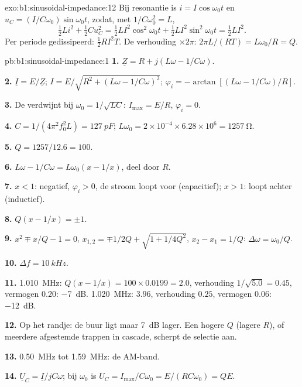\begin{solution}{exo:b1:sinusoidal-impedance:12}
Bij resonantie is $i = I\cos\omega_0 t$ en $u_C = (I/C\omega_0)\sin\omega_0 t$,
zodat, met $1/C\omega_0^2 = L$,
\[
\tfrac12 Li^2 + \tfrac12 Cu_C^2 = \tfrac12 LI^2\cos^2\omega_0 t
+ \tfrac12 LI^2\sin^2\omega_0 t = \tfrac12 LI^2 .
\]
Per periode gedissipeerd: $\tfrac12 RI^2T$. De verhouding $\times 2\pi$: $2\pi L/(RT)
= L\omega_0/R = Q$.
\end{solution}

\begin{solution}{pb:b1:sinusoidal-impedance:1}
\textbf{1.} $\underline Z = R + j(L\omega - 1/C\omega)$.

\textbf{2.} $\underline I = E/\underline Z$; $I = E/\sqrt{R^2 + (L\omega -
1/C\omega)^2}$; $\varphi_i = -\arctan[(L\omega - 1/C\omega)/R]$.

\textbf{3.} De  verdwijnt bij $\omega_0 = 1/\sqrt{LC}$: $I_{\max}
= E/R$, $\varphi_i = 0$.

\textbf{4.} $C = 1/(4\pi^2f_0^2L) = \qty{127}{pF}$; $L\omega_0 = 2\times10^{-4}
\times 6.28\times10^6 = \qty{1257}{\ohm}$.

\textbf{5.} $Q = 1257/12.6 = 100$.

\textbf{6.} $L\omega - 1/C\omega = L\omega_0(x - 1/x)$, deel door $R$.

\textbf{7.} $x < 1$:  negatief, $\varphi_i > 0$, de stroom
loopt voor (capacitief); $x > 1$: loopt achter (inductief).

\textbf{8.} $Q(x - 1/x) = \pm1$.

\textbf{9.} $x^2 \mp x/Q - 1 = 0$, $x_{1,2} = \mp1/2Q + \sqrt{1 + 1/4Q^2}$,
$x_2 - x_1 = 1/Q$: $\Delta\omega = \omega_0/Q$.

\textbf{10.} $\Delta f = \qty{10}{kHz}$.

\textbf{11.} \qty{1.010}{MHz}: $Q(x - 1/x) = 100 \times 0.0199 = 2.0$,
verhouding $1/\sqrt{5.0} = 0.45$, vermogen $0.20$: \qty{-7}{dB}. \qty{1.020}{MHz}:
$3.96$, verhouding $0.25$, vermogen $0.06$: \qty{-12}{dB}.

\textbf{12.} Op het randje: de buur ligt maar \qty{7}{dB} lager. Een hogere
$Q$ (lagere $R$), of meerdere afgestemde trappen in cascade, scherpt de
selectie aan.

\textbf{13.} \qty{0.50}{MHz} tot \qty{1.59}{MHz}: de AM-band.

\textbf{14.} $\underline U_C = \underline I/jC\omega$; bij $\omega_0$ is
$U_C = I_{\max}/C\omega_0 = E/(RC\omega_0) = QE$.


\end{solution}
